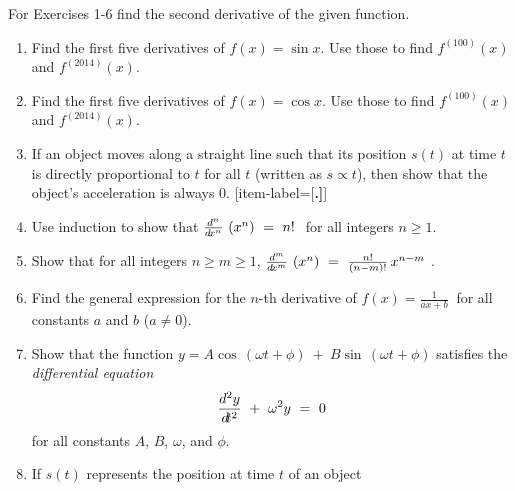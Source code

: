 \divider
\vspace{3mm}
\startexercises\label{sec1dot6}
{\small
{}
\par\noindent For Exercises 1-6 find the second derivative of the given function.
\begin{enumerate}[item-label={\bfseries \arabic*.}]
 \item Find the first five derivatives of $f(x) = \sin x$. Use those to find $f^{(100)}(x)$ and $f^{(2014)}(x)$.
 \item Find the first five derivatives of $f(x) = \cos x$. Use those to find $f^{(100)}(x)$ and $f^{(2014)}(x)$.
 \item If an object moves along a straight line such that its position
  $s(t)$ at time $t$ is directly proportional to $t$ for all $t$ (written as
  $s \propto t$), then show that the object's acceleration is always 0.
[item-label={{[\bfseries \arabic*.]}}]
 \item\label{exer:dnxn} Use induction to show that
  $\frac{d^n}{d\!x^n}\,\left(x^n\right) ~=~ n!~$ for all integers $n \ge 1$.
 \item Show that for all integers $n \ge m \ge 1$,
  $\frac{d^{m}}{d\!x^{m}}\,\left(x^n\right) ~=~ \frac{n!}{(n - m)!}\,x^{n - m} ~$.
 \item Find the general expression for the $n$-th derivative of
  $f(x) = \frac{1}{ax + b} ~$ for all constants $a$ and $b$ ($a \ne 0$).
 \item Show that the function $y = A \cos\,(\omega t + \phi) ~+~  B \sin\,(\omega t + \phi)$
  satisfies the \emph{differential equation}
  \[
   \frac{d^2y}{d\!t^2} ~+~ \omega^2 y ~=~ 0
  \]
  for all constants $A$, $B$, $\omega$, and $\phi$.
 \item If $s(t)$ represents the position at time $t$ of an object

\end{enumerate}}
